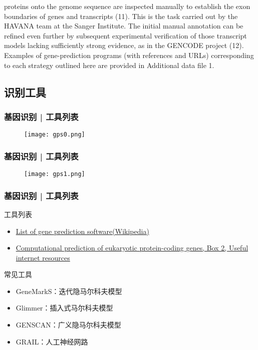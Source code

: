 \documentclass[table]{beamer}
\begin{document}
{proteins onto the genome sequence are inspected manually to establish the exon boundaries of genes and transcripts (11). This is the task carried out by the HAVANA team at the Sanger Institute. The initial manual annotation can be refined even further by subsequent experimental verification of those transcript models lacking sufficiently strong evidence, as in the GENCODE project (12). Examples of gene-prediction programs (with references and URLs) corresponding to each strategy outlined here are provided in Additional data file 1.
}

\subsection{识别工具}
\begin{frame}
  \frametitle{基因识别 | 工具列表}
  \begin{figure}
    \centering
    \texttt{[image: gps0.png]}
  \end{figure}
\end{frame}

\begin{frame}
  \frametitle{基因识别 | 工具列表}
  \begin{figure}
    \centering
    \texttt{[image: gps1.png]}
  \end{figure}
\end{frame}

\begin{frame}
  \frametitle{基因识别 | 工具列表}
  \begin{block}{工具列表}
    \begin{itemize}
      \item \href{http://en.wikipedia.org/wiki/List\_of\_gene\_prediction\_software}{List of gene prediction software(Wikipedia)}
      \item \href{http://www.nature.com/nrg/journal/v3/n9/box/nrg890\_BX2.html}{Computational prediction of eukaryotic protein-coding genes, Box 2, Useful internet resources}
    \end{itemize}
  \end{block}
  \begin{block}{常见工具}
    \begin{itemize}
      \item GeneMarkS：迭代隐马尔科夫模型
      \item Glimmer：插入式马尔科夫模型
      \item GENSCAN：广义隐马尔科夫模型
      \item GRAIL：人工神经网路
    \end{itemize}
  \end{block}
\end{frame}
\end{document}
